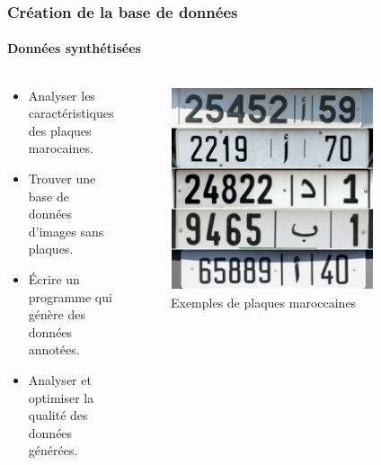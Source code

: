 \begin{frame}
\frametitle{Création de la base de données}
\framesubtitle{Données synthétisées}

\begin{columns}
\begin{column}{6cm}
    \begin{itemize}
        \item<1->   Analyser les caractéristiques des plaques marocaines.
        \item<2->   Trouver une base de données d'images sans plaques.
        \item<3->   Écrire un programme qui génère des données annotées.
        \item<4->   Analyser et optimiser la qualité des données générées.
    \end{itemize}
\end{column}
\begin{column}{6cm}
    \begin{figure}
        \begin{overprint}
            \centering\includegraphics[width=0.8\textwidth]{figures/Plaques.PNG}\caption{Exemples de plaques maroccaines}

\end{overprint}
\end{figure}
\end{column}
\end{columns}
\end{frame}
